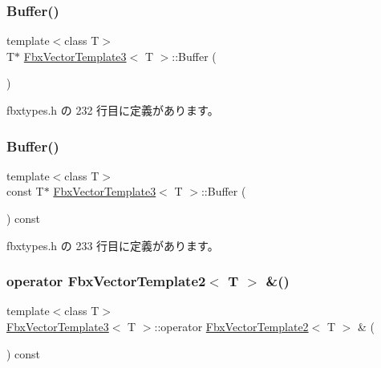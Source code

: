 \subsubsection{\texorpdfstring{Buffer()}{Buffer()}\hspace{0.1cm}{\footnotesize\ttfamily [1/2]}}
{\footnotesize\ttfamily template$<$class T$>$ \\
T$\ast$ \hyperlink{class_fbx_vector_template3}{Fbx\+Vector\+Template3}$<$ T $>$\+::Buffer (\begin{DoxyParamCaption}{ }\end{DoxyParamCaption})\hspace{0.3cm}{\ttfamily [inline]}}



 fbxtypes.\+h の 232 行目に定義があります。

\mbox{\label{class_fbx_vector_template3_ae5a5582d606a687f346f470d94ff551d}} 
\subsubsection{\texorpdfstring{Buffer()}{Buffer()}\hspace{0.1cm}{\footnotesize\ttfamily [2/2]}}
{\footnotesize\ttfamily template$<$class T$>$ \\
const T$\ast$ \hyperlink{class_fbx_vector_template3}{Fbx\+Vector\+Template3}$<$ T $>$\+::Buffer (\begin{DoxyParamCaption}{ }\end{DoxyParamCaption}) const\hspace{0.3cm}{\ttfamily [inline]}}



 fbxtypes.\+h の 233 行目に定義があります。

\mbox{\label{class_fbx_vector_template3_ae3592b0f562df1272dc844f451cb0111}} 
\subsubsection{\texorpdfstring{operator Fbx\+Vector\+Template2$<$ T $>$ \&()}{operator FbxVectorTemplate2< T > \&()}}
{\footnotesize\ttfamily template$<$class T$>$ \\
\hyperlink{class_fbx_vector_template3}{Fbx\+Vector\+Template3}$<$ T $>$\+::operator \hyperlink{class_fbx_vector_template2}{Fbx\+Vector\+Template2}$<$ T $>$ \& (\begin{DoxyParamCaption}{ }\end{DoxyParamCaption}) const\hspace{0.3cm}{\ttfamily [inline]}}



